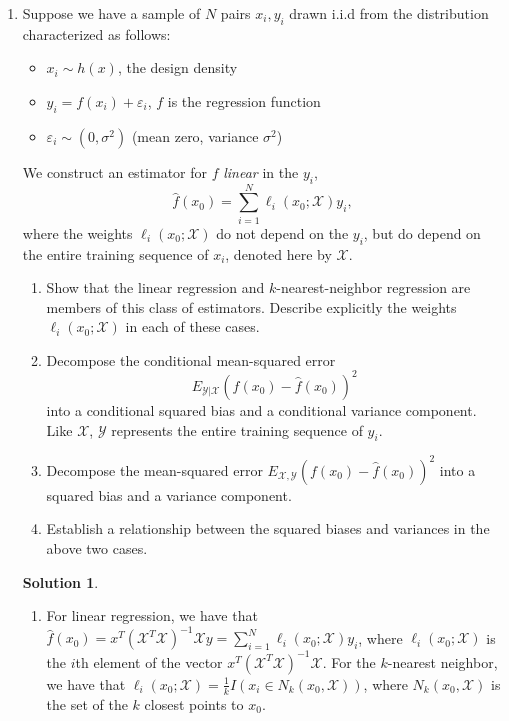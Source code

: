 \documentclass[]{book}
\theoremstyle{definition}
\newtheorem*{soln}{Solution}
\newcommand{\XX}{\mathbf{X}} \newcommand{\YY}{\mathbf{Y}}
\begin{document}
\begin{enumerate}
	\item Suppose we have a sample of $N$ pairs $x_i,y_i$ drawn i.i.d from the
	      distribution characterized as follows:
	      \begin{itemize}
		      \item[] $x_i\sim h(x)$, the design density
		      \item[] $y_i=f(x_i)+\varepsilon_i$, $f$ is the regression function
		      \item[] $\varepsilon_i\sim(0,\sigma^2)$ (mean zero, variance
			      $\sigma^2$)
	      \end{itemize}
	      We construct an estimator for $f$ \emph{linear} in the $y_i$,
	      \[\hat f(x_0)=\sum_{i=1}^N\ell_i(x_0;\mathcal{X})y_i,\] where the
	      weights $\ell_i(x_0;\mathcal{X})$ do not depend on the $y_i$, but do
	      depend on the entire training sequence of $x_i$, denoted here by
	      $\mathcal{X}$.
	      \begin{enumerate}
		      \item Show that the linear regression and $k$-nearest-neighbor
		            regression are members of this class of estimators. Describe
		            explicitly the weights $\ell_i(x_0;\mathcal{X})$ in each of
		            these cases.
		      \item Decompose the conditional mean-squared error
		            \[E_{\mathcal{Y}|\mathcal{X}}(f(x_0)-\hat f(x_0))^2\] into a
		            conditional squared bias and a conditional variance
		            component. Like $\mathcal{X}$, $\mathcal{Y}$ represents the
		            entire training sequence of $y_i$.
		      \item Decompose the mean-squared error
		            $E_{\mathcal{X,Y}}(f(x_0)-\hat f(x_0))^2$ into a squared
		            bias and a variance component.
		      \item Establish a relationship between the squared biases and
		            variances in the above two cases.
	      \end{enumerate}

	      \begin{soln}{ \renewcommand{\XX}{\mathcal{X}}
			      \renewcommand{\YY}{\mathcal{Y}}
			      \begin{enumerate}
				      \item For linear regression, we have that $\hat f(x_0) =
					            x^T(\XX^T\XX)^{-1}\XX
					            y=\sum_{i=1}^N\ell_i(x_0;\XX)y_i$, where
				            $\ell_i(x_0;\XX)$ is the $i$th element of the
				            vector $x^T(\XX^T\XX)^{-1}\XX$. For the
				            $k$-nearest neighbor, we have that
				            $\ell_i(x_0;\XX)=\frac{1}{k}I(x_i\in
					            N_k(x_0,\XX))$, where $N_k(x_0,\XX)$ is the set
				            of the $k$ closest points to $x_0$.


\end{enumerate}}
\end{soln}
\end{enumerate}
\end{document}
